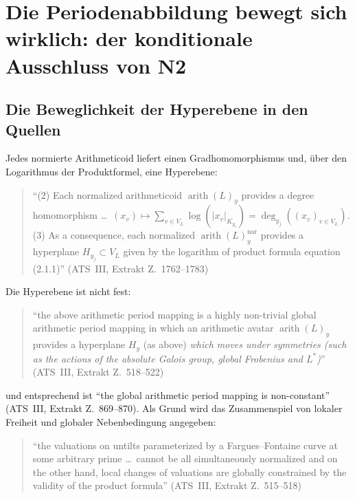 \documentclass[11pt,a4paper]{article}
\theoremstyle{definition}
\theoremstyle{plain}
\theoremstyle{definition}
\newcommand{\arith}{\operatorname{arith}}
\newcommand{\anchor}[2]{(#1, Extrakt Z.~#2)}
\begin{document}
\section{Die Periodenabbildung bewegt sich wirklich: der konditionale Ausschluss
von N2}
\label{sec:D1}

\subsection{Die Beweglichkeit der Hyperebene in den Quellen}

Jedes normierte Arithmeticoid liefert einen Gradhomomorphismus und, über den
Logarithmus der Produktformel, eine Hyperebene:

\begin{quote}\small
``(2) Each normalized arithmeticoid $\arith(L)_y$ provides a degree homomorphism
\ldots\ $(x_v) \mapsto \sum_{v \in V_L} \log(|x_v|_{K_{y_v}}) = \deg_{y_j}((x_v)_{v \in V_L})$.
(3) As a consequence, each normalized $\arith(L)^{\mathrm{nor}}_y$ provides a
hyperplane $H_{y_j} \subset V_L$ given by the logarithm of product formula equation
(2.1.1)'' \hfill\anchor{ATS~III}{1762--1783}
\end{quote}

Die Hyperebene ist nicht fest:

\begin{quote}\small
``the above arithmetic period mapping is a highly non-trivial global arithmetic
period mapping in which an arithmetic avatar $\arith(L)_y$ provides a hyperplane
$H_y$ (as above) \emph{which moves under symmetries (such as the actions of the
absolute Galois group, global Frobenius and $L^*$)}''
\hfill\anchor{ATS~III}{518--522}
\end{quote}

und entsprechend ist ``the global arithmetic period mapping is non-constant''
\anchor{ATS~III}{869--870}. Als Grund wird das Zusammenspiel von lokaler Freiheit und
globaler Nebenbedingung angegeben:

\begin{quote}\small
``the valuations on untilts parameterized by a Fargues--Fontaine curve at some
arbitrary prime \ldots\ cannot be all simultaneously normalized and on the other
hand, local changes of valuations are globally constrained by the validity of the
product formula'' \hfill\anchor{ATS~III}{515--518}
\end{quote}
\end{document}
